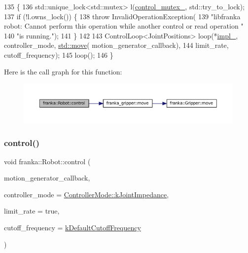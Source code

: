\begin{DoxyCode}
135                              \{
136   std::unique\_lock<std::mutex> l(\hyperlink{classfranka_1_1Robot_a719ad1fab76f8edfc9f6f761671c1375}{control\_mutex\_}, std::try\_to\_lock);
137   \textcolor{keywordflow}{if} (!l.owns\_lock()) \{
138     \textcolor{keywordflow}{throw} InvalidOperationException(
139         \textcolor{stringliteral}{"libfranka robot: Cannot perform this operation while another control or read operation "}
140         \textcolor{stringliteral}{"is running."});
141   \}
142 
143   ControlLoop<JointPositions> loop(*\hyperlink{classfranka_1_1Robot_aca155054184e5b6478942fd6a1b82ba4}{impl\_}, controller\_mode, \hyperlink{namespacefranka__gripper_a1356a87108d2229401d3755bd3e53bdf}{std::move}(
      motion\_generator\_callback),
144                                    limit\_rate, cutoff\_frequency);
145   loop();
146 \}
\end{DoxyCode}
Here is the call graph for this function\+:
\nopagebreak
\begin{figure}[H]
\begin{center}
\leavevmode
\includegraphics[width=350pt]{classfranka_1_1Robot_a8a41a2f208cc0c7e68569a550af4e1b2_cgraph}
\end{center}
\end{figure}
\mbox{\label{classfranka_1_1Robot_a7b2856e3c3c7a5582fd16f7414c30221}} 
\subsubsection{\texorpdfstring{control()}{control()}\hspace{0.1cm}{\footnotesize\ttfamily [7/9]}}
{\footnotesize\ttfamily void franka\+::\+Robot\+::control (\begin{DoxyParamCaption}\item[{std\+::function$<$ \hyperlink{classfranka_1_1JointVelocities}{Joint\+Velocities}(const \hyperlink{structfranka_1_1RobotState}{Robot\+State} \&, \hyperlink{classfranka_1_1Duration}{franka\+::\+Duration})$>$}]{motion\+\_\+generator\+\_\+callback,  }\item[{\hyperlink{namespacefranka_a3e20bc77587e2c0c53598753e3f4816b}{Controller\+Mode}}]{controller\+\_\+mode = {\ttfamily \hyperlink{namespacefranka_a3e20bc77587e2c0c53598753e3f4816baa7cd8fc7552b5b9c50684e57f032d724}{Controller\+Mode\+::k\+Joint\+Impedance}},  }\item[{\hyperlink{classbool}{bool}}]{limit\+\_\+rate = {\ttfamily true},  }\item[{double}]{cutoff\+\_\+frequency = {\ttfamily \hyperlink{namespacefranka_ad8e3b7da346e03181ab5ac138a4171d4}{k\+Default\+Cutoff\+Frequency}} }\end{DoxyParamCaption})}

